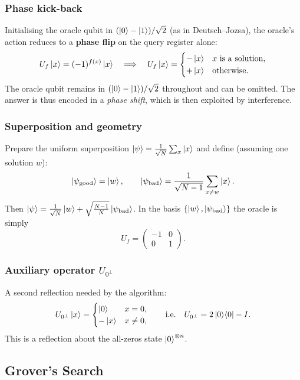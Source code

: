 \documentclass[10pt,a4paper]{article}
\begin{document}
\subsubsection*{Phase kick-back}

Initialising the oracle qubit in $(\ket{0}-\ket{1})/\sqrt{2}$ (as in Deutsch--Jozsa), the oracle's action reduces to a \textbf{phase flip} on the query register alone:
\[
U_f\ket{x} = (-1)^{f(x)}\ket{x}
\quad\Longrightarrow\quad
U_f\ket{x}=\begin{cases}-\ket{x}&x\text{ is a solution},\\+\ket{x}&\text{otherwise}.\end{cases}
\]
The oracle qubit remains in $(\ket{0}-\ket{1})/\sqrt{2}$ throughout and can be omitted. The answer is thus encoded in a \emph{phase shift}, which is then exploited by interference.

\subsubsection*{Superposition and geometry}

Prepare the uniform superposition $\ket{\psi}=\frac{1}{\sqrt{N}}\sum_{x}\ket{x}$ and define (assuming one solution $w$):
\[
\ket{\psi_{\mathrm{good}}}=\ket{w},\qquad
\ket{\psi_{\mathrm{bad}}}=\frac{1}{\sqrt{N-1}}\sum_{x\neq w}\ket{x}.
\]
Then $\ket{\psi}=\frac{1}{\sqrt{N}}\ket{w}+\sqrt{\frac{N-1}{N}}\ket{\psi_{\mathrm{bad}}}$. In the basis $\{\ket{w},\ket{\psi_{\mathrm{bad}}}\}$ the oracle is simply
\[
U_f=\begin{pmatrix}-1&0\\0&1\end{pmatrix}.
\]

\subsubsection*{Auxiliary operator $U_{0^\perp}$}

A second reflection needed by the algorithm:
\[
U_{0^\perp}\ket{x}=\begin{cases}\ket{0}&x=0,\\-\ket{x}&x\neq0,\end{cases}
\qquad\text{i.e.}\quad U_{0^\perp}=2\ket{0}\!\bra{0}-I.
\]
This is a reflection about the all-zeros state $\ket{0}^{\otimes n}$.
\subsection{Grover's Search}
\end{document}
